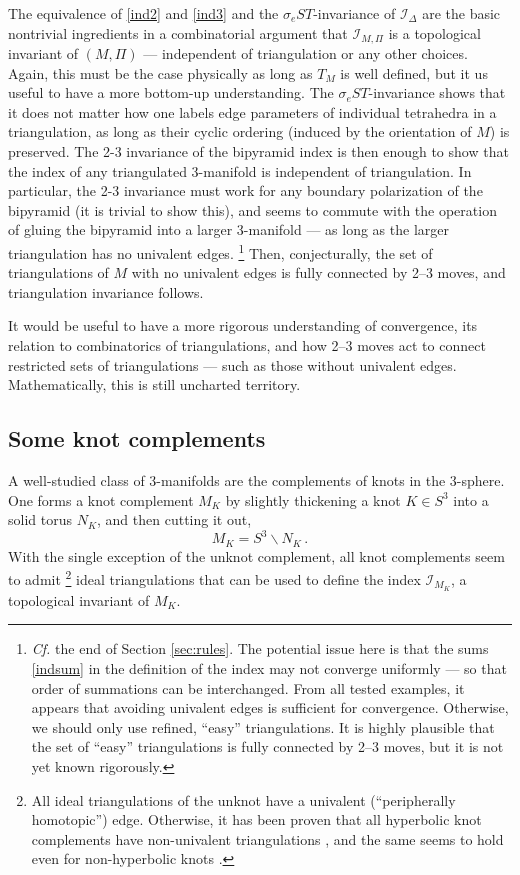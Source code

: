 \documentclass[11pt,letterpaper]{article}
\numberwithin{equation}{section}
\newcommand{\be}{\begin{equation}}
\newcommand{\ee}{\end{equation}}
\newcommand{\bs}{\backslash}
\newcommand{\CI}{\mathcal{I}}
\begin{document}
The equivalence of \eqref{ind2} and \eqref{ind3} and the $\sigma_eST$-invariance of $\CI_\Delta$ are the basic nontrivial ingredients in a combinatorial argument that $\CI_{M,\Pi}$ is a topological invariant of $(M,\Pi)$ --- independent of triangulation or any other choices. Again, this must be the case physically as long as $T_M$ is well defined, but it us useful to have a more bottom-up understanding. The $\sigma_eST$-invariance shows that it does not matter how one labels edge parameters of individual tetrahedra in a triangulation, as long as their cyclic ordering (induced by the orientation of $M$) is preserved. The 2-3 invariance of the bipyramid index is then enough to show that the index of any triangulated 3-manifold is independent of triangulation. In particular, the 2-3 invariance must work for any boundary polarization of the bipyramid (it is trivial to show this), and seems to commute with the operation of gluing the bipyramid into a larger 3-manifold --- as long as the larger triangulation has no univalent edges.%
%
\footnote{\emph{Cf.} the end of Section \ref{sec:rules}. The potential issue here is that the sums \eqref{indsum} in the definition of the index may not converge uniformly --- so that order of summations can be interchanged. From all tested examples, it appears that avoiding univalent edges is sufficient for convergence. Otherwise, we should only use refined, ``easy'' triangulations. It is highly plausible that the set of ``easy'' triangulations is fully connected by 2--3 moves, but it is not yet known rigorously.} %
%
Then, conjecturally, the set of triangulations of $M$ with no univalent edges is fully connected by 2--3 moves, and triangulation invariance follows.

It would be useful to have a more rigorous understanding of convergence, its relation to combinatorics of triangulations, and how 2--3 moves act to connect restricted sets of triangulations --- such as those without univalent edges. Mathematically, this is still uncharted territory.



\subsection{Some knot complements}
\label{sec:knots}

A well-studied class of 3-manifolds are the complements of knots in the 3-sphere. One forms a knot complement $M_K$ by slightly thickening a knot $K\in S^3$ into a solid torus $N_K$, and then cutting it out,
%
\be M_K = S^3\bs N_K\,. \ee
%
With the single exception of the unknot complement, all knot complements seem to admit%
%
\footnote{All ideal triangulations of the unknot have a univalent (``peripherally homotopic'') edge. Otherwise, it has been proven that all hyperbolic knot complements have non-univalent triangulations \cite{Tillmann-def}, and the same seems to hold even for non-hyperbolic knots \cite{Segerman-def}.}
%
ideal triangulations that can be used to define the index $\CI_{M_K}$, a topological invariant of $M_K$.
\end{document}
